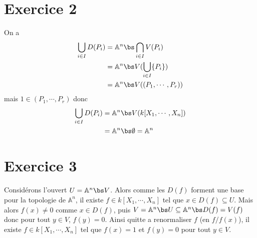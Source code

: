     \section{Exercice 2}
        On a
        \begin{align*}
            \bigcup_{i \in I} D(P_i) &= \mathbb{A}^n \bs \bigcap_{i \in I} V(P_i) \\
            &= \mathbb{A}^n \bs V(\bigcup_{i \in I} \{P_i\}) \\
            &= \mathbb{A}^n \bs V((P_1, \cdots, P_r)) \\
        \end{align*}
        mais $1 \in (P_1, \cdots, P_r)$ donc
        \begin{align*}
            \bigcup_{i \in I} D(P_i) &= \mathbb{A}^n \bs V(k[X_1, \cdots, X_n]) \\
            &= \mathbb{A}^n \bs \emptyset = \mathbb{A}^n \\
        \end{align*}

    \section{Exercice 3}
        Considérons l'ouvert $U = \mathbb{A}^n \bs V$. Alors comme les $D(f)$ forment une base pour la topologie de $\mathbb{A}^n$, il existe $f \in k[X_1, \cdots, X_n]$ tel que $x \in D(f) \subseteq U$. Mais alors $f(x) \neq 0$ comme $x \in D(f)$, puis $V = \mathbb{A}^n \bs U \subseteq \mathbb{A}^n \bs D(f) = V(f)$ donc pour tout $y \in V$, $f(y) = 0$. Ainsi quitte a renormaliser $f$ (en $f/f(x)$), il existe $f \in k[X_1, \cdots, X_n]$ tel que $f(x) = 1$ et $f(y) = 0$ pour tout $y \in V$.

